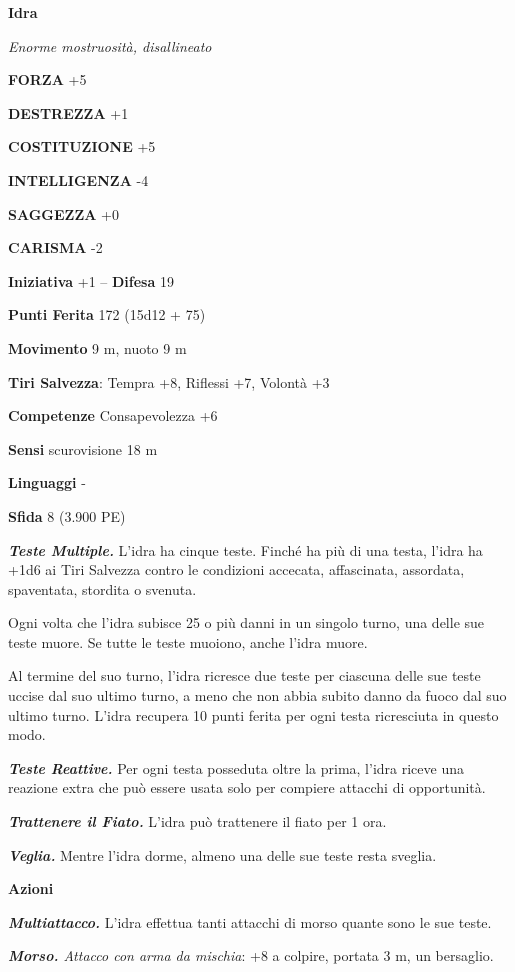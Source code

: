 \begin{multicols}{2}
\medskip{}\textbf{Idra}

\emph{Enorme mostruosità, disallineato}

\textbf{FORZA} +5

\textbf{DESTREZZA} +1

\textbf{COSTITUZIONE} +5

\textbf{INTELLIGENZA} -4

\textbf{SAGGEZZA} +0

\textbf{CARISMA} -2

\textbf{Iniziativa} +1 -- \textbf{Difesa} 19

\textbf{Punti Ferita} 172 (15d12 + 75)

\textbf{Movimento} 9 m, nuoto 9 m

\textbf{Tiri Salvezza}: Tempra +8, Riflessi +7, Volontà +3

\textbf{Competenze} Consapevolezza +6

\textbf{Sensi} scurovisione 18 m

\textbf{Linguaggi} -

\textbf{Sfida} 8 (3.900 PE)

\emph{\textbf{Teste Multiple.}} L'idra ha cinque teste. Finché ha più di una testa, l'idra ha +1d6 ai Tiri Salvezza contro le condizioni accecata, affascinata, assordata, spaventata, stordita o svenuta.

Ogni volta che l'idra subisce 25 o più danni in un singolo turno, una delle sue teste muore. Se tutte le teste muoiono, anche l'idra muore.

Al termine del suo turno, l'idra ricresce due teste per ciascuna delle sue teste uccise dal suo ultimo turno, a meno che non abbia subito danno da fuoco dal suo ultimo turno. L'idra recupera 10 punti ferita per ogni testa ricresciuta in questo modo.

\emph{\textbf{Teste Reattive.}} Per ogni testa posseduta oltre la prima, l'idra riceve una reazione extra che può essere usata solo per compiere attacchi di opportunità.

\emph{\textbf{Trattenere il Fiato.}} L'idra può trattenere il fiato per 1 ora.

\emph{\textbf{Veglia.}} Mentre l'idra dorme, almeno una delle sue teste resta sveglia.

\textbf{Azioni}

\emph{\textbf{Multiattacco.}} L'idra effettua tanti attacchi di morso quante sono le sue teste.

\emph{\textbf{Morso.} Attacco con arma da mischia}: +8 a colpire, portata 3 m, un bersaglio.


\end{multicols}

